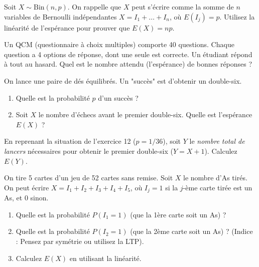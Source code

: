 \begin{exercicebox}
Soit $X \sim \text{Bin}(n, p)$. On rappelle que $X$ peut s'écrire comme la somme de $n$ variables de Bernoulli indépendantes $X = I_1 + \dots + I_n$, où $E(I_j) = p$.
Utilisez la linéarité de l'espérance pour prouver que $E(X) = np$.
\end{exercicebox}


\begin{exercicebox}
Un QCM (questionnaire à choix multiples) comporte 40 questions. Chaque question a 4 options de réponse, dont une seule est correcte. Un étudiant répond à tout au hasard.
Quel est le nombre attendu (l'espérance) de bonnes réponses ?
\end{exercicebox}

\begin{exercicebox}
On lance une paire de dés équilibrés. Un "succès" est d'obtenir un double-six.
\begin{enumerate}
    \item Quelle est la probabilité $p$ d'un succès ?
    \item Soit $X$ le nombre d'échecs avant le premier double-six. Quelle est l'espérance $E(X)$ ?
\end{enumerate}
\end{exercicebox}

\begin{exercicebox}
En reprenant la situation de l'exercice 12 ($p=1/36$), soit $Y$ le \textit{nombre total de lancers} nécessaires pour obtenir le premier double-six ($Y = X + 1$).
Calculez $E(Y)$.
\end{exercicebox}

\begin{exercicebox}
On tire 5 cartes d'un jeu de 52 cartes sans remise. Soit $X$ le nombre d'As tirés. On peut écrire $X = I_1 + I_2 + I_3 + I_4 + I_5$, où $I_j=1$ si la $j$-ème carte tirée est un As, et 0 sinon.
\begin{enumerate}
    \item Quelle est la probabilité $P(I_1 = 1)$ (que la 1ère carte soit un As) ?
    \item Quelle est la probabilité $P(I_2 = 1)$ (que la 2ème carte soit un As) ? (Indice : Pensez par symétrie ou utilisez la LTP).
    \item Calculez $E(X)$ en utilisant la linéarité.
\end{enumerate}
\end{exercicebox}

